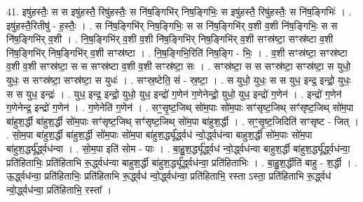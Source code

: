 \documentclass[17pt]{extarticle}
\begin{document}
41. इषु॑हस्तैः॒ स स इषु॑हस्तै॒ रिषु॑हस्तैः॒ स नि॑ष॒ङ्गिभि॑र् निष॒ङ्गिभिः॒ स इषु॑हस्तै॒ रिषु॑हस्तैः॒ स नि॑ष॒ङ्गिभिः॑ । . इषु॑हस्तै॒रितीषु॑ - ह॒स्तैः॒ । . स नि॑ष॒ङ्गिभि॑र् निष॒ङ्गिभिः॒ स स नि॑ष॒ङ्गिभि॑र् व॒शी व॒शी नि॑ष॒ङ्गिभिः॒ स स नि॑ष॒ङ्गिभि॑र् व॒शी । . नि॒ष॒ङ्गिभि॑र् व॒शी व॒शी नि॑ष॒ङ्गिभि॑र् निष॒ङ्गिभि॑र् व॒शी सꣳस्र॑ष्टा॒ सꣳस्र॑ष्टा व॒शी नि॑ष॒ङ्गिभि॑र् निष॒ङ्गिभि॑र् व॒शी सꣳस्र॑ष्टा । . नि॒ष॒ङ्गिभि॒रिति॑ निष॒ङ्गि - भिः॒ । . व॒शी सꣳस्र॑ष्टा॒ सꣳस्र॑ष्टा व॒शी व॒शी सꣳस्र॑ष्टा॒ स स सꣳस्र॑ष्टा व॒शी व॒शी सꣳस्र॑ष्टा॒ सः । . सꣳस्र॑ष्टा॒ स स सꣳस्र॑ष्टा॒ सꣳस्र॑ष्टा॒ स युधो॒ युधः॒ स सꣳस्र॑ष्टा॒ सꣳस्र॑ष्टा॒ स युधः॑ । . सꣳस्र॒ष्टेति॒ सं - स्र॒ष्टा॒ । . स युधो॒ युधः॒ स स युध॒ इन्द्र॒ इन्द्रो॒ युधः॒ स स युध॒ इन्द्रः॑ । . युध॒ इन्द्र॒ इन्द्रो॒ युधो॒ युध॒ इन्द्रो॑ ग॒णेन॑ ग॒णेनेन्द्रो॒ युधो॒ युध॒ इन्द्रो॑ ग॒णेन॑ । . इन्द्रो॑ ग॒णेन॑ ग॒णेनेन्द्र॒ इन्द्रो॑ ग॒णेन॑ । . ग॒णेनेति॑ ग॒णेन॑ । . सꣳ॒॒सृ॒ष्ट॒जिथ् सो॑म॒पाः सो॑म॒पाः सꣳ॑सृष्ट॒जिथ् सꣳ॑सृष्ट॒जिथ् सो॑म॒पा बा॑हुश॒र्द्धी बा॑हुश॒र्द्धी सो॑म॒पाः सꣳ॑सृष्ट॒जिथ् सꣳ॑सृष्ट॒जिथ् सो॑म॒पा बा॑हुश॒र्द्धी । . सꣳ॒॒सृ॒ष्ट॒जिदिति॑ सꣳसृष्ट - जित् । . सो॒म॒पा बा॑हुश॒र्द्धी बा॑हुश॒र्द्धी सो॑म॒पाः सो॑म॒पा बा॑हुश॒र्द्ध्यू᳚र्द्ध्वध॑ न्वो॒र्द्ध्वध॑न्वा बाहुश॒र्द्धी सो॑म॒पाः सो॑म॒पा बा॑हुश॒र्द्ध्यू᳚र्द्ध्वध॑न्वा । . सो॒म॒पा इति॑ सोम - पाः । . बा॒हु॒श॒र्द्ध्यू᳚र्द्ध्वध॑ न्वो॒र्द्ध्वध॑न्वा बाहुश॒र्द्धी बा॑हुश॒र्द्ध्यू᳚र्द्ध्वध॑न्वा॒ प्रति॑हिताभिः॒ प्रति॑हिताभि रू॒र्द्ध्वध॑न्वा बाहुश॒र्द्धी बा॑हुश॒र्द्ध्यू᳚र्द्ध्वध॑न्वा॒ प्रति॑हिताभिः । . बा॒हु॒श॒र्द्धीति॑ बाहु - श॒र्द्धी । . ऊ॒र्द्ध्वध॑न्वा॒ प्रति॑हिताभिः॒ प्रति॑हिताभि रू॒र्द्ध्वध॑ न्वो॒र्द्ध्वध॑न्वा॒ प्रति॑हिताभि॒ रस्ता ऽस्ता॒ प्रति॑हिताभि रू॒र्द्ध्वध॑ न्वो॒र्द्ध्वध॑न्वा॒ प्रति॑हिताभि॒ रस्ता᳚ । \newline
\end{document}
